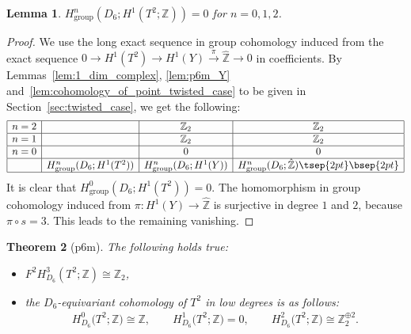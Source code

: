 \documentclass[pdftex]{sigma}
\newtheorem{thm}{Theorem}[section]
\newtheorem{lem}[thm]{Lemma}
\theoremstyle{definition}
\newcommand{\Z}{\mathbb{Z}}
\begin{document}
\begin{lem}
$H^n_{\mathrm{group}}(D_6; H^1(T^2; \Z)) = 0$ for $n = 0, 1, 2$.
\end{lem}

\begin{proof}
We use the long exact sequence in group cohomology induced from the exact sequence $0 \to H^1(T^2) \to H^1(Y) \overset{\pi}{\to} \hat{\Z} \to 0$ in coef\/f\/icients. By Lemmas~\ref{lem:1_dim_complex}, \ref{lem:p6m_Y} and~\ref{lem:cohomology_of_point_twisted_case} to be given in Section~\ref{sec:twisted_case}, we get the following:
$$
\begin{array}{|c|c|c|c|}
\hline
n = 2 & & \Z_2 & \Z_2 \\
\hline
n = 1 & & \Z_2 & \Z_2 \\
\hline
n = 0 & & 0 & 0 \\
\hline
& H^n_{\mathrm{group}}(D_6; H^1(T^2)) & H^n_{\mathrm{group}}(D_6; H^1(Y)) &
H^n_{\mathrm{group}}(D_6; \hat{\Z})\tsep{2pt}\bsep{2pt}\\
\hline
\end{array}
$$
It is clear that $H^0_{\mathrm{group}}(D_6; H^1(T^2)) = 0$. The homomorphism in group cohomology induced from $\pi\colon H^1(Y) \to \hat{\Z}$ is surjective in degree $1$ and $2$, because $\pi \circ s = 3$. This leads to the remaining vanishing.
\end{proof}

\begin{thm}[\textsf{p6m}]
The following holds true:
\begin{itemize}\itemsep=0pt
\item[$(a)$] $F^2H^3_{D_6}(T^2; \Z) \cong \Z_2$,

\item[$(b)$] the $D_6$-equivariant cohomology of $T^2$ in low degrees is as follows:
\begin{gather*}
H^0_{D_6}\big(T^2; \Z\big) \cong \Z, \qquad H^1_{D_6}\big(T^2; \Z\big) = 0, \qquad H^2_{D_6}\big(T^2; \Z\big) \cong \Z_2^{\oplus 2}.
\end{gather*}
\end{itemize}
\end{thm}
\end{document}

